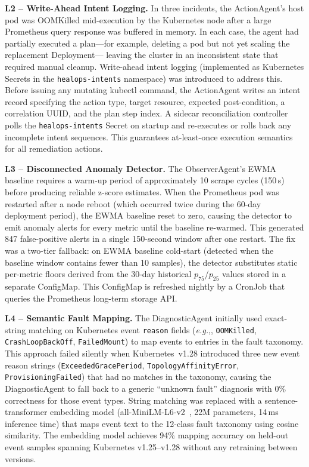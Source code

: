 \documentclass[journal,10pt,twoside]{IEEEtran}
\newcommand{\eg}{\textit{e.g.},}
\begin{document}
\textbf{L2 -- Write-Ahead Intent Logging.}
In three incidents, the ActionAgent's host pod was OOMKilled mid-execution
by the Kubernetes node after a large Prometheus query response was buffered
in memory. In each case, the agent had partially executed a plan---for
example, deleting a pod but not yet scaling the replacement Deployment---
leaving the cluster in an inconsistent state that required manual cleanup.
Write-ahead intent logging (implemented as Kubernetes Secrets in the
\texttt{healops-intents} namespace) was introduced to address this.
Before issuing any mutating kubectl command, the ActionAgent writes an
intent record specifying the action type, target resource, expected
post-condition, a correlation UUID, and the plan step index. A sidecar
reconciliation controller polls the \texttt{healops-intents} Secret on
startup and re-executes or rolls back any incomplete intent sequences.
This guarantees at-least-once execution semantics for all remediation
actions.

\textbf{L3 -- Disconnected Anomaly Detector.}
The ObserverAgent's EWMA baseline requires a warm-up period of approximately
10 scrape cycles (150\,s) before producing reliable z-score estimates.
When the Prometheus pod was restarted after a node reboot (which occurred
twice during the 60-day deployment period), the EWMA baseline reset to
zero, causing the detector to emit anomaly alerts for every metric until
the baseline re-warmed. This generated 847 false-positive alerts in a
single 150-second window after one restart. The fix was a two-tier
fallback: on EWMA baseline cold-start (detected when the baseline window
contains fewer than 10 samples), the detector substitutes static
per-metric floors derived from the 30-day historical $p_{75}$/$p_{25}$
values stored in a separate ConfigMap. This ConfigMap is refreshed nightly
by a CronJob that queries the Prometheus long-term storage API.

\textbf{L4 -- Semantic Fault Mapping.}
The DiagnosticAgent initially used exact-string matching on Kubernetes
event \texttt{reason} fields (\eg, \texttt{OOMKilled},
\texttt{CrashLoopBackOff}, \texttt{FailedMount}) to map events to
entries in the fault taxonomy. This approach failed silently when
Kubernetes~v1.28 introduced three new event reason strings
(\texttt{ExceededGracePeriod}, \texttt{TopologyAffinityError},
\texttt{ProvisioningFailed}) that had no matches in the taxonomy, causing
the DiagnosticAgent to fall back to a generic ``unknown fault'' diagnosis
with 0\% correctness for those event types. String matching was replaced
with a sentence-transformer embedding model
(all-MiniLM-L6-v2~\cite{reimers2019sbert}, 22M parameters, 14\,ms
inference time) that maps event text to the 12-class fault taxonomy
using cosine similarity. The embedding model achieves 94\% mapping
accuracy on held-out event samples spanning Kubernetes v1.25--v1.28
without any retraining between versions.
\end{document}
